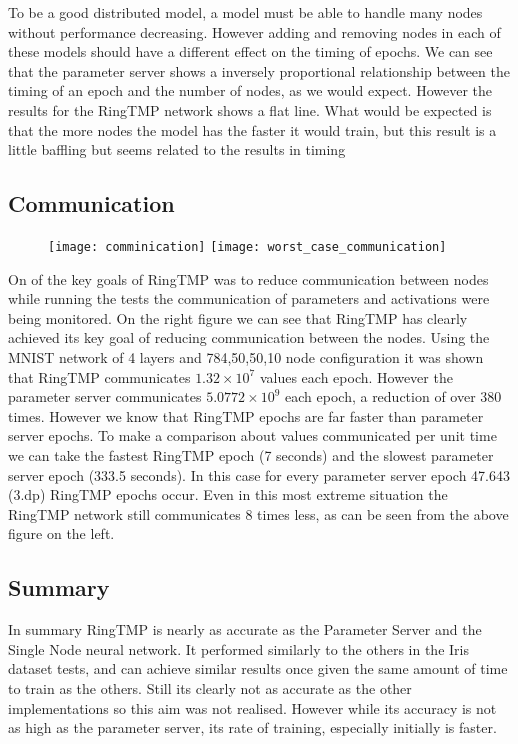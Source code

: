 To be a good distributed model, a model must be able to handle many nodes
without performance decreasing. However adding and removing nodes in each of
these models should have a different effect on the timing of epochs. We can see
that the parameter server shows a inversely proportional relationship between
the timing of an epoch and the number of nodes, as we would expect. However the
results for the RingTMP network shows a flat line. What would be expected is
that the more nodes the model has the faster it would train, but this result is
a little baffling but seems related to the results in timing

\subsection{Communication}
\begin{figure}[h]
    \centering
    \texttt{[image: comminication]}
    \texttt{[image: worst\_case\_communication]}

\end{figure}
On of the key goals of RingTMP was to reduce communication between nodes while
running the tests the communication of parameters and activations were being
monitored. On the right figure we can see that RingTMP has clearly achieved its
key goal of reducing communication between the nodes. Using the MNIST network of
4 layers and 784,50,50,10 node configuration it was shown that RingTMP
communicates \(1.32 \times 10^{7}\) values each epoch. However the parameter
server communicates \( 5.0772 \times 10^{9}\) each epoch, a reduction of over
380 times. However we know that RingTMP epochs are far faster than parameter
server epochs. To make a comparison about values communicated per unit time we
can take the fastest RingTMP epoch (7 seconds) and the slowest parameter server
epoch (333.5 seconds). In this case for every parameter server epoch 47.643
(3.dp) RingTMP epochs occur. Even in this most extreme situation the RingTMP
network still communicates 8 times less, as can be seen from the above figure on the
left.


\subsection{Summary}
In summary RingTMP is nearly as accurate as the Parameter Server and the Single
Node neural network. It performed similarly to the others in the Iris dataset
tests, and can achieve similar results once given the same amount of time to
train as the others. Still its clearly not as accurate as the other
implementations so this aim was not realised. However while its accuracy is not
as high as the parameter server, its rate of training, especially initially is
faster.

